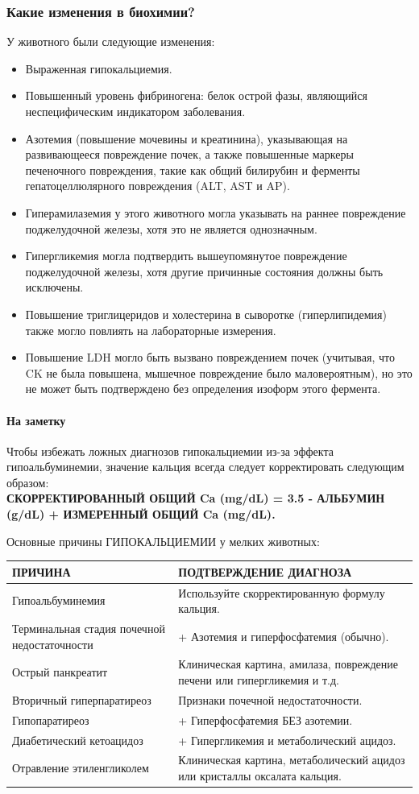 \documentclass[a4paper,12pt]{book}
\begin{document}
\subsubsection*{Какие изменения в биохимии?}
У животного были следующие изменения:
\begin{itemize}
\item Выраженная гипокальциемия.
\item Повышенный уровень фибриногена: белок острой фазы, являющийся неспецифическим индикатором заболевания.
\item Азотемия (повышение мочевины и креатинина), указывающая на развивающееся повреждение почек, а также повышенные маркеры печеночного повреждения, такие как общий билирубин и ферменты гепатоцеллюлярного повреждения (ALT, AST и AP).
\item Гиперамилаземия у этого животного могла указывать на раннее повреждение поджелудочной железы, хотя это не является однозначным.
\item Гипергликемия могла подтвердить вышеупомянутое повреждение поджелудочной железы, хотя другие причинные состояния должны быть исключены.
\item Повышение триглицеридов и холестерина в сыворотке (гиперлипидемия) также могло повлиять на лабораторные измерения.
\item Повышение LDH могло быть вызвано повреждением почек (учитывая, что CK не была повышена, мышечное повреждение было маловероятным), но это не может быть подтверждено без определения изоформ этого фермента.
\end{itemize}

\paragraph{На заметку}
Чтобы избежать ложных диагнозов гипокальциемии из-за эффекта гипоальбуминемии, значение кальция всегда следует корректировать следующим образом: \\[2mm]
\textbf{СКОРРЕКТИРОВАННЫЙ ОБЩИЙ Ca (mg/dL) = 3.5 - АЛЬБУМИН (g/dL) + ИЗМЕРЕННЫЙ ОБЩИЙ Ca (mg/dL).}

Основные причины ГИПОКАЛЬЦИЕМИИ у мелких животных:

\begin{tabular}{p{5cm}p{9cm}}
\toprule
ПРИЧИНА & ПОДТВЕРЖДЕНИЕ ДИАГНОЗА \\
\midrule
Гипоальбуминемия & Используйте скорректированную формулу кальция. \\
Терминальная стадия почечной недостаточности & + Азотемия и гиперфосфатемия (обычно). \\
Острый панкреатит & Клиническая картина, амилаза, повреждение печени или гипергликемия и т.д. \\
Вторичный гиперпаратиреоз & Признаки почечной недостаточности. \\
Гипопаратиреоз & + Гиперфосфатемия БЕЗ азотемии. \\
Диабетический кетоацидоз & + Гипергликемия и метаболический ацидоз. \\
Отравление этиленгликолем & Клиническая картина, метаболический ацидоз или кристаллы оксалата кальция. \\
\bottomrule
\end{tabular}
\end{document}
